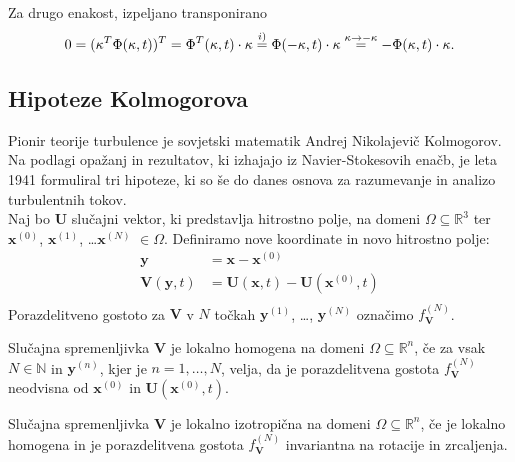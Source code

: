 \documentclass[mat2, tisk]{fmfdelo}
\newcommand{\R}{\mathbb R}
\newcommand{\N}{\mathbb N}
\newcommand{\bd}{\textbf}
\begin{document}
\begin{dokaz}
\begin{enumerate}
\begin{align*}
\end{align*}
Za drugo enakost, izpeljano transponirano
\begin{align*}
0 = (\text{\bd{$\kappa$}}^T \Phi(\text{\bd{$\kappa$}}, t))^T = \Phi^T(\text{\bd{$\kappa$}}, t) \cdot \text{\bd{$\kappa$}} \stackrel{i)}{=} \Phi(-\text{\bd{$\kappa$}}, t) \cdot \text{\bd{$\kappa$}} \stackrel{\text{\bd{$\kappa$}} \rightarrow - \text{\bd{$\kappa$}}}{=}  -\Phi(\text{\bd{$\kappa$}}, t) \cdot \text{\bd{$\kappa$}}.
\end{align*}
\end{enumerate}
\end{dokaz}

\subsection{Hipoteze Kolmogorova}
Pionir teorije turbulence je sovjetski matematik Andrej Nikolajevič Kolmogorov. 
Na podlagi opažanj in rezultatov, ki izhajajo iz Navier-Stokesovih enačb, je
leta 1941 formuliral tri hipoteze, ki so še do danes osnova za 
razumevanje in analizo turbulentnih tokov.\\
\noindent
Naj bo $\bd{U}$ slučajni vektor, ki predstavlja hitrostno polje, 
na domeni $\Omega \subseteq \R^3$ ter $\bd{x}^{(0)}$, $\bd{x}^{(1)}$, \dots $\bd{x}^{(N)}$ $\in \Omega$.
Definiramo nove koordinate in novo hitrostno polje:
\begin{align*}
\bd{y} &= \bd{x} - \bd{x}^{(0)} \\
\bd{V}(\bd{y}, t) &= \bd{U}(\bd{x}, t) - \bd{U}(\bd{x}^{(0)}, t) \\
\end{align*}
Porazdelitveno gostoto za $\bd{V}$ v $N$ točkah $\bd{y}^{(1)}$, \dots, $\bd{y}^{(N)}$
označimo $f_{\bd{V}}^{(N)}$. 

\begin{definicija}
Slučajna spremenljivka $\bd{V}$ je lokalno homogena na domeni 
$\Omega \subseteq \R^n$, če za vsak $N\in \N$ in $\bd{y}^{(n)}$, 
kjer je $n = 1, \dots, N$, velja, da je porazdelitvena gostota 
$f_\bd{V}^{(N)}$ neodvisna od $\bd{x}^{(0)}$ in $\bd{U}(\bd{x}^{(0)}, t)$.
\end{definicija}

\begin{definicija}
Slučajna spremenljivka $\bd{V}$ je lokalno izotropična na domeni 
$\Omega \subseteq \R^n$, če je lokalno homogena in je porazdelitvena 
gostota $f_\bd{V}^{(N)}$ invariantna na rotacije in zrcaljenja.
\end{definicija}
\end{document}
